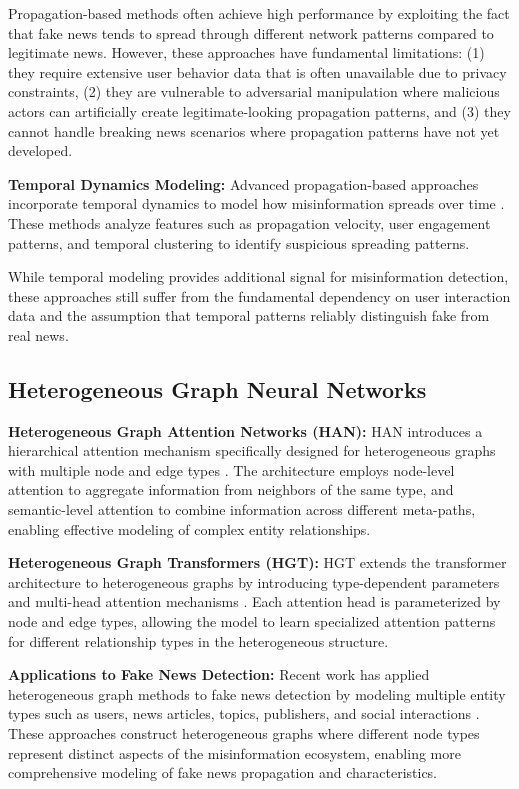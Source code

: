 Propagation-based methods often achieve high performance by exploiting the fact that fake news tends to spread through different network patterns compared to legitimate news. However, these approaches have fundamental limitations: (1) they require extensive user behavior data that is often unavailable due to privacy constraints, (2) they are vulnerable to adversarial manipulation where malicious actors can artificially create legitimate-looking propagation patterns, and (3) they cannot handle breaking news scenarios where propagation patterns have not yet developed.

\textbf{Temporal Dynamics Modeling:} Advanced propagation-based approaches incorporate temporal dynamics to model how misinformation spreads over time \cite{ma2016detecting, liu2018early}. These methods analyze features such as propagation velocity, user engagement patterns, and temporal clustering to identify suspicious spreading patterns.

While temporal modeling provides additional signal for misinformation detection, these approaches still suffer from the fundamental dependency on user interaction data and the assumption that temporal patterns reliably distinguish fake from real news.

\subsection{Heterogeneous Graph Neural Networks}

\textbf{Heterogeneous Graph Attention Networks (HAN):} HAN introduces a hierarchical attention mechanism specifically designed for heterogeneous graphs with multiple node and edge types \cite{wang2019han}. The architecture employs node-level attention to aggregate information from neighbors of the same type, and semantic-level attention to combine information across different meta-paths, enabling effective modeling of complex entity relationships.

\textbf{Heterogeneous Graph Transformers (HGT):} HGT extends the transformer architecture to heterogeneous graphs by introducing type-dependent parameters and multi-head attention mechanisms \cite{hu2020heterogeneous}. Each attention head is parameterized by node and edge types, allowing the model to learn specialized attention patterns for different relationship types in the heterogeneous structure.

\textbf{Applications to Fake News Detection:} Recent work has applied heterogeneous graph methods to fake news detection by modeling multiple entity types such as users, news articles, topics, publishers, and social interactions \cite{dou2021user, lu2020gcan, silva2021embracing}. These approaches construct heterogeneous graphs where different node types represent distinct aspects of the misinformation ecosystem, enabling more comprehensive modeling of fake news propagation and characteristics.

